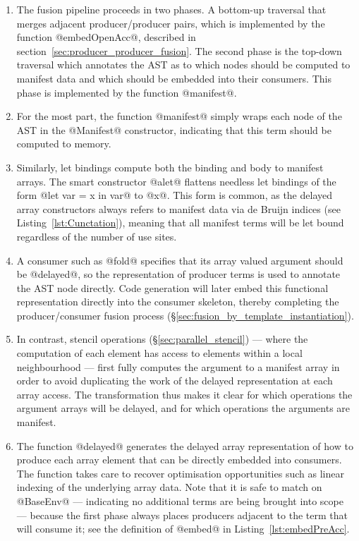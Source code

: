 \begin{enumerate}
\item The fusion pipeline proceeds in two phases. A bottom-up traversal that
    merges adjacent producer/producer pairs, which is implemented by the
    function @embedOpenAcc@, described in
    section~\ref{sec:producer_producer_fusion}. The second phase is the top-down
    traversal which annotates the AST as to which nodes should be computed to
    manifest data and which should be embedded into their consumers. This phase
    is implemented by the function @manifest@.

\item For the most part, the function @manifest@ simply wraps each node of the
    AST in the @Manifest@ constructor, indicating that this term should be
    computed to memory.

\item Similarly, let bindings compute both the binding and body to manifest
    arrays. The smart constructor @alet@ flattens needless let bindings of the
    form @let var = x in var@ to @x@. This form is common, as the delayed array
    constructors always refers to manifest data via de Bruijn indices (see
    Listing~\ref{lst:Cunctation}), meaning that all manifest terms will be let
    bound regardless of the number of use sites.

\item A consumer such as @fold@ specifies that its array valued argument should
    be @delayed@, so the representation of producer terms is used to annotate
    the AST node directly. Code generation will later embed this functional
    representation directly into the consumer skeleton, thereby completing the
    producer/consumer fusion process
    (\S\ref{sec:fusion_by_template_instantiation}).

\item In contrast, stencil operations (\S\ref{sec:parallel_stencil}) --- where
    the computation of each element has access to elements within a local
    neighbourhood --- first fully computes the argument to a manifest array in
    order to avoid duplicating the work of the delayed representation at each
    array access. The transformation thus makes it clear for which operations
    the argument arrays will be delayed, and for which operations the arguments
    are manifest.

\item The function @delayed@ generates the delayed array representation of how
    to produce each array element that can be directly embedded into consumers.
    The function takes care to recover optimisation opportunities such as linear
    indexing of the underlying array data. Note that it is safe to match on
    @BaseEnv@ --- indicating no additional terms are being brought into scope
    --- because the first phase always places producers adjacent to the term
    that will consume it; see the definition of @embed@ in
    Listing~\ref{lst:embedPreAcc}.

\end{enumerate}

